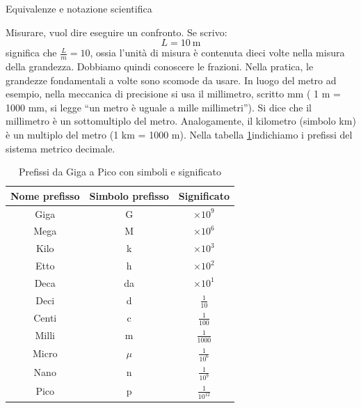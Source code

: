 \documentclass[12pt,a4paper,oneside]{book}
\makeatletter
\renewcommand{\section}{\@startsection{section}{1}{\z@}
{-4ex \@plus -1ex \@minus -.4ex}
{1ex \@plus.2ex }
{\normalfont\large\sffamily\bfseries}}
\theoremstyle{esercizio}
\makeatother
\begin{document}
\section{Equivalenze e notazione scientifica}

Misurare, vuol dire eseguire un confronto. Se scrivo:
\[
L=\SI{10}{\meter}
\]
significa che $\frac{L}{m} = 10$, ossia l'unità di misura è contenuta dieci volte nella misura della grandezza. Dobbiamo quindi conoscere le frazioni. Nella pratica, le grandezze fondamentali a volte sono scomode da usare. In luogo del metro ad esempio, nella meccanica di precisione si usa il millimetro, scritto mm ( 1 m = 1000 mm, si legge ``un metro è uguale a mille millimetri''). Si dice che il millimetro è un sottomultiplo del metro. Analogamente, il kilometro (simbolo km) è un multiplo del metro (1 km = 1000 m). Nella tabella \ref{tab:prefixes}indichiamo i prefissi del sistema metrico decimale. 

\begin{table}[h!]
	\centering
	\begin{tabular}{|c|c|c|}
		\hline
		\textbf{Nome prefisso} & \textbf{Simbolo prefisso} & \textbf{Significato} \\
		\hline
		Giga & G & \( \times 10^9 \) \\
		\hline
		Mega & M & \( \times 10^6 \) \\
		\hline
		Kilo & k & \( \times 10^3 \) \\
		\hline
		Etto & h & \( \times 10^2 \) \\
		\hline
		Deca & da & \( \times 10^1 \) \\
		\hline
		Deci & d & \( \frac{1}{10} \) \\
		\hline
		Centi & c & \( \frac{1}{100} \) \\
		\hline
		Milli & m & \( \frac{1}{1000} \) \\
		\hline
		Micro & \(\mu\) & \( \frac{1}{10^6} \) \\
		\hline
		Nano & n & \( \frac{1}{10^9} \) \\
		\hline
		Pico & p & \( \frac{1}{10^{12}} \) \\
		\hline
	\end{tabular}
	\caption{Prefissi da Giga a Pico con simboli e significato}
	\label{tab:prefixes}
\end{table}
\end{document}
